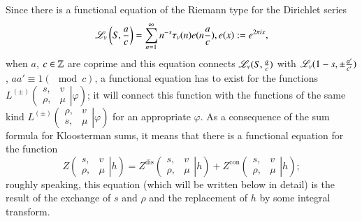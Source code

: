 Since there is a functional equation of the Riemann type for the Dirichlet series 
$$
\mathscr{L}_v \left(S, \frac{a}{c} \right) = \sum\limits^\infty_{n=1} n^{-s} \tau_v (n) e (n\frac{a}{c}), e(x) : = e^{2\pi i x}, 
$$
when $a$, $c \in \mathbb{Z}$ are coprime and this equation connects $\mathscr{L}_v (S, \frac{a}{c})$ with $\mathscr{L}_v (1-s, \pm \frac{a'}{c'})$, $aa'\equiv 1 (\mod c)$, a functional equation has to exist for the functions $L^{(\pm)} \left(\left.
\begin{matrix}
s, & v \\
\rho,& \mu
\end{matrix}
\right| \varphi \right)$; it will connect this function with the functions of the same kind $L^{(\pm)} \left(\left.\begin{matrix}
\rho ,& v\\
s, & \mu
\end{matrix}
\right| \varphi \right) $  for an appropriate $\varphi$. As a consequence of the sum formula for Kloosterman sums, it means that there is a functional equation for the function
\begin{equation}
Z\left(\left.\begin{matrix}
s, & v\\
\rho, & \mu
\end{matrix}
\right|  h \right)   = Z^{\text{dis}}
\left(\left.\begin{matrix}
s, & v\\
\rho, & \mu
\end{matrix}
\right| h \right)  + Z^{\text{con}}
\left( 
\left. 
\begin{matrix}
s, & v\\
\rho, & \mu
\end{matrix}
\right| h
\right); \label{art7-eq2.15}
\end{equation}
roughly speaking, this equation (which will be written below in detail) is the result of the exchange of $s$ and $\rho$ and the replacement of $h$ by some integral transform.

